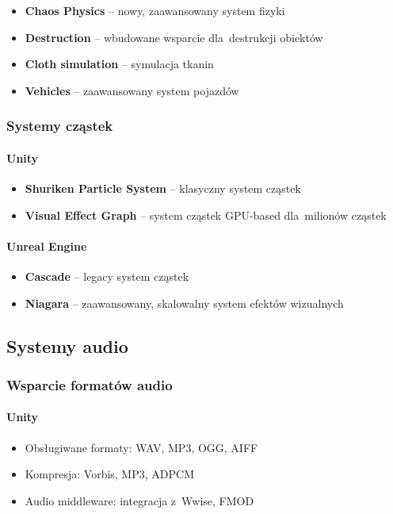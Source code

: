 \begin{itemize}
    \item \textbf{Chaos Physics} -- nowy, zaawansowany system fizyki~\cite{unreal_chaos}
    \item \textbf{Destruction} -- wbudowane wsparcie dla~destrukcji obiektów~\cite{unreal_chaos}
    \item \textbf{Cloth simulation} -- symulacja tkanin~\cite{unreal_chaos}
    \item \textbf{Vehicles} -- zaawansowany system pojazdów~\cite{gregory2018game}
\end{itemize}

\subsubsection{Systemy cząstek}

\paragraph{Unity}
\begin{itemize}
    \item \textbf{Shuriken Particle System} -- klasyczny system cząstek~\cite{unity_vfx_graph}
    \item \textbf{Visual Effect Graph} -- system cząstek GPU-based dla~milionów cząstek~\cite{unity_vfx_graph}
\end{itemize}

\paragraph{Unreal Engine}
\begin{itemize}
    \item \textbf{Cascade} -- legacy system cząstek~\cite{unreal_niagara}
    \item \textbf{Niagara} -- zaawansowany, skalowalny system efektów wizualnych~\cite{unreal_niagara}
\end{itemize}

\subsection{Systemy audio}

\subsubsection{Wsparcie formatów audio}

\paragraph{Unity}
\begin{itemize}
    \item Obsługiwane formaty: WAV, MP3, OGG, AIFF~\cite{unity_physics}
    \item Kompresja: Vorbis, MP3, ADPCM~\cite{unity_physics}
    \item Audio middleware: integracja z~Wwise, FMOD~\cite{firat2022sound}
\end{itemize}

